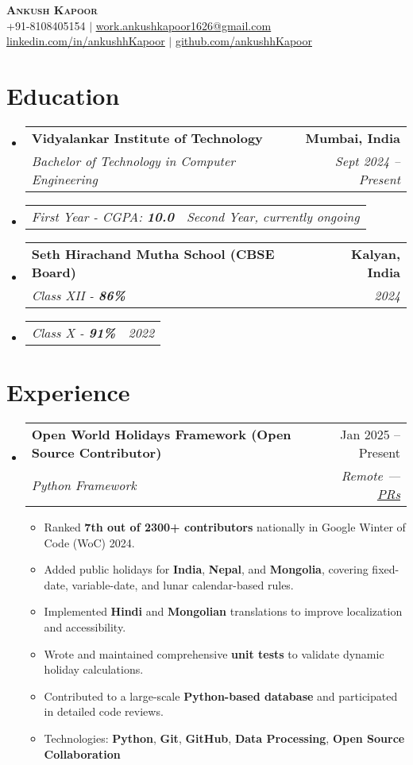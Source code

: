 \documentclass[letterpaper,11pt]{article}
\makeatletter
\newcommand{\resumeItem}[1]{
  \item\small{#1 \vspace{-2pt}}
}
\newcommand{\resumeSubheading}[4]{
  \vspace{-2pt}\item
    \begin{tabular*}{0.97\textwidth}[t]{l@{\extracolsep{\fill}}r}
      \textbf{#1} & #2 \\
      \textit{\small#3} & \textit{\small #4} \\
    \end{tabular*}\vspace{-7pt}
}
\newcommand{\resumeSubSubheading}[2]{
    \item
    \begin{tabular*}{0.97\textwidth}{l@{\extracolsep{\fill}}r}
      \textit{\small#1} & \textit{\small #2} \\
    \end{tabular*}\vspace{-5pt}
}
\newcommand{\resumeSubHeadingListStart}{\begin{itemize}[leftmargin=0.15in, label={}]}
\newcommand{\resumeSubHeadingListEnd}{\end{itemize}}
\newcommand{\resumeItemListStart}{\begin{itemize}}
\newcommand{\resumeItemListEnd}{\end{itemize}\vspace{-5pt}}
\makeatother
\begin{document}
\begin{center}
    \textbf{\Huge \scshape Ankush Kapoor} \\ \vspace{1pt}
    \small +91-8108405154 $|$ \href{mailto:work.ankushkapoor1626@gmail.com}{\underline{work.ankushkapoor1626@gmail.com}} \\
    \href{https://linkedin.com/in/ankushhKapoor}{\underline{linkedin.com/in/ankushhKapoor}} $|$
    \href{https://github.com/ankushhKapoor}{\underline{github.com/ankushhKapoor}}
\end{center}

\section{Education}
  \resumeSubHeadingListStart
    \resumeSubheading
      {Vidyalankar Institute of Technology}{\textbf{Mumbai, India}}
      {Bachelor of Technology in Computer Engineering}{Sept 2024 -- Present}
    \resumeSubSubheading
      {First Year - CGPA: \textbf{10.0}}{Second Year, currently ongoing}

    \resumeSubheading
      {Seth Hirachand Mutha School (CBSE Board)}{\textbf{Kalyan, India}}
      {Class XII - \textbf{86\%}}{2024}
    \resumeSubSubheading
      {Class X - \textbf{91\%}}{2022}
  \resumeSubHeadingListEnd

\section{Experience}
  \resumeSubHeadingListStart
    \resumeSubheading
      {Open World Holidays Framework (Open Source Contributor)}{Jan 2025 -- Present}
      {Python Framework}{Remote — \href{https://github.com/vacanza/holidays/pulls/ankushhKapoor}{\underline{PRs}}}
      \resumeItemListStart
        \resumeItem{Ranked \textbf{7th out of 2300+ contributors} nationally in Google Winter of Code (WoC) 2024.}
        \resumeItem{Added public holidays for \textbf{India}, \textbf{Nepal}, and \textbf{Mongolia}, covering fixed-date, variable-date, and lunar calendar-based rules.}
        \resumeItem{Implemented \textbf{Hindi} and \textbf{Mongolian} translations to improve localization and accessibility.}
        \resumeItem{Wrote and maintained comprehensive \textbf{unit tests} to validate dynamic holiday calculations.}
        \resumeItem{Contributed to a large-scale \textbf{Python-based database} and participated in detailed code reviews.}
        \resumeItem{Technologies: \textbf{Python}, \textbf{Git}, \textbf{GitHub}, \textbf{Data Processing}, \textbf{Open Source Collaboration}}
      \resumeItemListEnd
  \resumeSubHeadingListEnd
\end{document}
